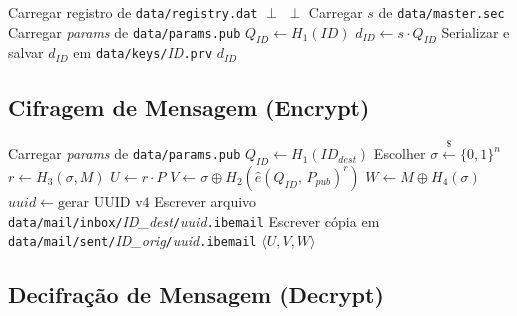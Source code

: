 \begin{algorithm}[H]
\caption{IBE Mail -- Extract}
\begin{algorithmic}[1]
  \State Carregar registro de \texttt{data/registry.dat}
    \Return $\perp$
  \EndIf
    \Return $\perp$ 
  \EndIf
  \State Carregar $s$ de \texttt{data/master.sec}
  \State Carregar \textit{params} de \texttt{data/params.pub}
  \State $Q_{\mathit{ID}} \leftarrow H_1(\mathit{ID})$ 
  \State $d_{\mathit{ID}} \leftarrow s \cdot Q_{\mathit{ID}}$
  \State Serializar e salvar $d_{\mathit{ID}}$ em \texttt{data/keys/}\textit{ID}\texttt{.prv}
  \Return $d_{\mathit{ID}}$
\EndProcedure
\end{algorithmic}
\end{algorithm}

\subsection{Cifragem de Mensagem (Encrypt)}

\begin{algorithm}[H]
\caption{IBE Mail -- Encrypt}
\begin{algorithmic}[1]
  \State Carregar \textit{params} de \texttt{data/params.pub}
  \State $Q_{\mathit{ID}} \leftarrow H_1(\mathit{ID}_{\mathit{dest}})$
  \State Escolher $\sigma \xleftarrow{\$} \{0,1\}^n$
  \State $r \leftarrow H_3(\sigma, M)$
  \State $U \leftarrow r \cdot P$
  \State $V \leftarrow \sigma \oplus H_2\!\left(\hat{e}(Q_{\mathit{ID}},\, P_{\mathit{pub}})^r\right)$
  \State $W \leftarrow M \oplus H_4(\sigma)$
  \State $\mathit{uuid} \leftarrow \text{gerar UUID v4}$
  \State Escrever arquivo \texttt{data/mail/inbox/}\textit{ID\_dest}\texttt{/}\textit{uuid}\texttt{.ibemail}
  \State Escrever cópia em \texttt{data/mail/sent/}\textit{ID\_orig}\texttt{/}\textit{uuid}\texttt{.ibemail}
  \Return $\langle U, V, W \rangle$
\EndProcedure
\end{algorithmic}
\end{algorithm}

\subsection{Decifração de Mensagem (Decrypt)}

